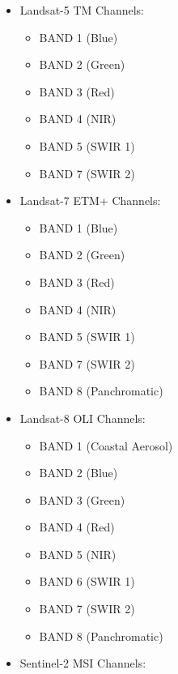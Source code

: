 \documentclass[a4paper]{article}
\begin{document}
    \begin{itemize}
      \item \small{Landsat-5 TM Channels:}
        \begin{itemize}
          \item \footnotesize{BAND 1 (Blue)}
          \item \footnotesize{BAND 2 (Green)}
          \item \footnotesize{BAND 3 (Red)}
          \item \footnotesize{BAND 4 (NIR)}
          \item \footnotesize{BAND 5 (SWIR 1)}
          \item \footnotesize{BAND 7 (SWIR 2)}
        \end{itemize}
      \item \small{Landsat-7 ETM+ Channels:}
        \begin{itemize}
          \item \footnotesize{BAND 1 (Blue)}
          \item \footnotesize{BAND 2 (Green)}
          \item \footnotesize{BAND 3 (Red)}
          \item \footnotesize{BAND 4 (NIR)}
          \item \footnotesize{BAND 5 (SWIR 1)}
          \item \footnotesize{BAND 7 (SWIR 2)}
          \item \footnotesize{BAND 8 (Panchromatic)}
        \end{itemize}
      \item \small{Landsat-8 OLI Channels:}
        \begin{itemize}
          \item \footnotesize{BAND 1 (Coastal Aerosol)}
          \item \footnotesize{BAND 2 (Blue)}
          \item \footnotesize{BAND 3 (Green)}
          \item \footnotesize{BAND 4 (Red)}
          \item \footnotesize{BAND 5 (NIR)}
          \item \footnotesize{BAND 6 (SWIR 1)}
          \item \footnotesize{BAND 7 (SWIR 2)}
          \item \footnotesize{BAND 8 (Panchromatic)}
        \end{itemize}
      \item \small{Sentinel-2 MSI Channels:}
        \begin{itemize}

\end{itemize}
\end{itemize}
\end{document}
